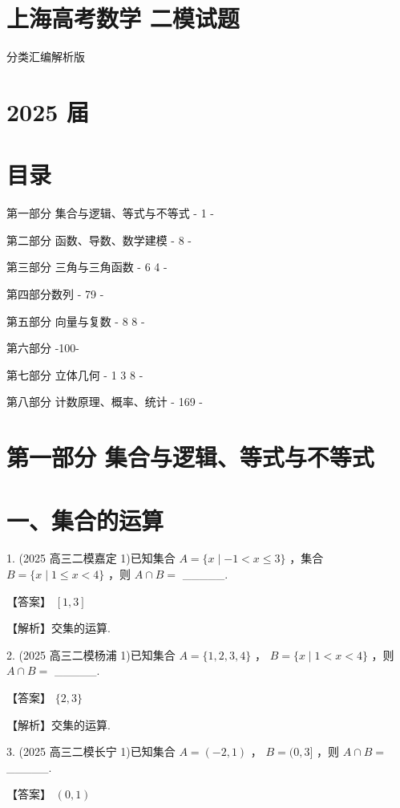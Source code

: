 \documentclass[10pt]{article}
\begin{document}
\section*{上海高考数学 二模试题}

分类汇编解析版

\section*{2025 届}

\section*{目录}

第一部分 集合与逻辑、等式与不等式 - 1 -

第二部分 函数、导数、数学建模 - 8 -

第三部分 三角与三角函数 - 6 4 -

第四部分数列 - 79 -

第五部分 向量与复数 - 8 8 -

第六部分 -100-

第七部分 立体几何 - 1 3 8 -

第八部分 计数原理、概率、统计 - 169 -

\section*{第一部分 集合与逻辑、等式与不等式}

\section*{一、集合的运算}

1. (2025 高三二模嘉定 1)已知集合 \(A = \{ x \mid   - 1 < x \leq  3\}\) ，集合 \(B = \{ x \mid  1 \leq  x < 4\}\) ，则 \(A \cap  B =\) \_\_\_\_\_.

【答案】 \(\left\lbrack  {1,3}\right\rbrack\)

【解析】交集的运算.

2. (2025 高三二模杨浦 1)已知集合 \(A = \{ 1,2,3,4\}\) ， \(B = \{ x \mid  1 < x < 4\}\) ，则 \(A \cap  B =\) \_\_\_\_\_.

【答案】 \(\{ 2,3\}\)

【解析】交集的运算.

3. (2025 高三二模长宁 1)已知集合 \(A = \left( {-2,1}\right)\) ， \(B = (0,3\rbrack\) ，则 \(A \cap  B =\) \_\_\_\_\_.

【答案】 \(\left( {0,1}\right)\)
\end{document}

